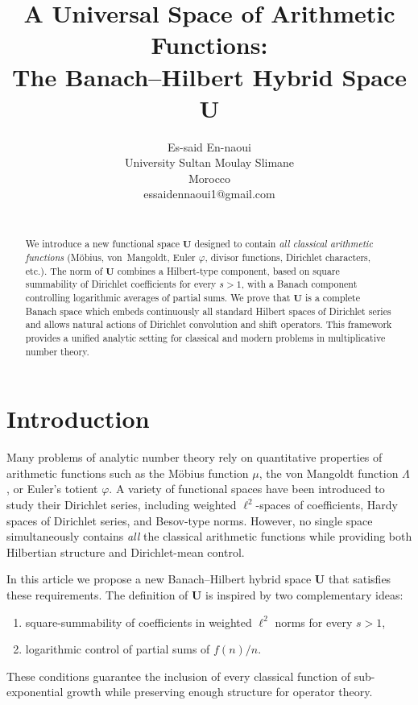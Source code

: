 \documentclass[11pt,a4paper]{article}
\theoremstyle{plain}
\theoremstyle{definition}
\theoremstyle{remark}
\begin{document}
	\title{A Universal Space of Arithmetic Functions:\\
		The Banach--Hilbert Hybrid Space $\mathbf{U}$}
	
	\author{
		{ \sc Es-said En-naoui } \\ 
		University Sultan Moulay Slimane\\ Morocco\\
		essaidennaoui1@gmail.com\\
		\\
	}
	
	\maketitle
	\begin{abstract}
		We introduce a new functional space $\mathbf{U}$ designed to contain 
		\emph{all classical arithmetic functions} (Möbius, von~Mangoldt, Euler $\varphi$, 
		divisor functions, Dirichlet characters, etc.). 
		The norm of $\mathbf{U}$ combines a Hilbert-type component,
		based on square summability of Dirichlet coefficients for every $s>1$,
		with a Banach component controlling logarithmic averages of partial sums.
		We prove that $\mathbf{U}$ is a complete Banach space which 
		embeds continuously all standard Hilbert spaces of Dirichlet series 
		and allows natural actions of Dirichlet convolution and shift operators.
		This framework provides a unified analytic setting for classical and modern 
		problems in multiplicative number theory.
	\end{abstract}
	
	\section{Introduction}
	
	Many problems of analytic number theory rely on quantitative properties 
	of arithmetic functions such as the Möbius function $\mu$, 
	the von Mangoldt function $\Lambda$, or Euler's totient $\varphi$.
	A variety of functional spaces have been introduced to study their Dirichlet series,
	including weighted $\ell^2$-spaces of coefficients, Hardy spaces of Dirichlet series,
	and Besov-type norms. 
	However, no single space simultaneously contains \emph{all} the classical arithmetic 
	functions while providing both Hilbertian structure and Dirichlet-mean control.
	
	In this article we propose a new Banach--Hilbert hybrid space $\mathbf{U}$
	that satisfies these requirements.
	The definition of $\mathbf{U}$ is inspired by two complementary ideas:
	\begin{enumerate}
		\item square-summability of coefficients in weighted $\ell^2$ norms for every $s>1$,
		\item logarithmic control of partial sums of $f(n)/n$.
	\end{enumerate}
	These conditions guarantee the inclusion of every classical function of 
	sub-exponential growth while preserving enough structure for operator theory.
	
\end{document}
